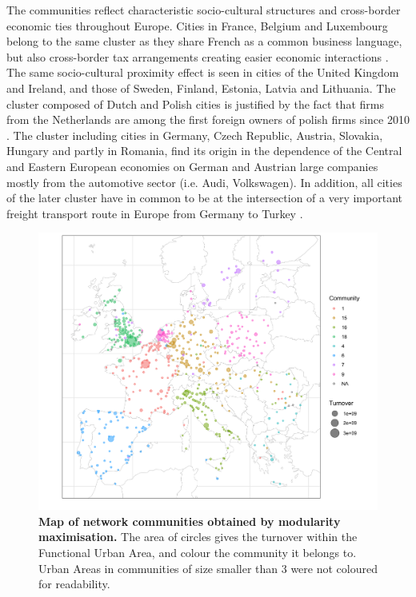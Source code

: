 \documentclass[10pt,letterpaper]{article}
\begin{document}
The communities reflect characteristic socio-cultural structures and cross-border economic ties throughout Europe. Cities in France, Belgium and Luxembourg belong to the same cluster as they share French as a common business language, but also cross-border tax arrangements creating easier economic interactions \cite{DecovilleDurand2019}. The same socio-cultural proximity effect is seen in cities of the United Kingdom and Ireland, and those of Sweden, Finland, Estonia, Latvia and Lithuania. The cluster composed of Dutch and Polish cities is justified by the fact that firms from the Netherlands are among the first foreign owners of polish firms since 2010 \cite{2020Zdanowska}. The cluster including cities in Germany, Czech Republic, Austria, Slovakia, Hungary and partly in Romania, find its origin in the dependence of the Central and Eastern European economies on German and Austrian large companies mostly from the automotive sector (i.e. Audi, Volkswagen). In addition, all cities of the later cluster have in common to be at the intersection of a very important freight transport route in Europe from Germany to Turkey \cite{Zdanowska2017}. 
\begin{figure}
    \begin{center}
    \includegraphics[width=\linewidth]{figures/Fig2.png}
    \end{center}
    \vspace{2cm}
    \caption{{\bf Map of network communities obtained by modularity maximisation.} The area of circles gives the turnover within the Functional Urban Area, and colour the community it belongs to. Urban Areas in communities of size smaller than 3 were not coloured for readability.}
    \label{fig:fig2}
\end{figure}
\end{document}
